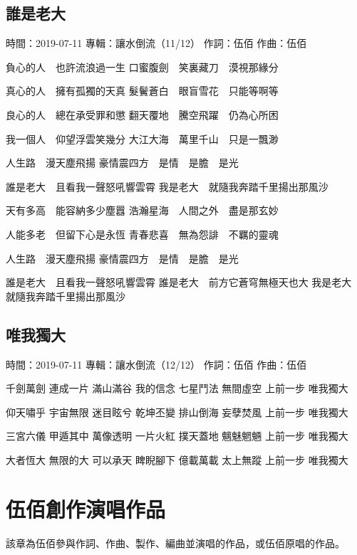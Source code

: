 \documentclass[UTF8,a4paper,oneside,twocolumn,12pt]{ctexbook}
\newcommand{\infopair}[2]{\textbullet #1：#2}
\newcommand{\zc}[1][伍佰]{\infopair{作詞}{#1}}
\newcommand{\zq}[1][伍佰]{\infopair{作曲}{#1}}
\newcommand{\zj}[1]{\infopair{專輯}{#1}}
\newcommand{\sj}[1]{\infopair{時間}{#1}}
\newenvironment{info}{\begin{flushleft}\kaishu
	}
	{\end{flushleft}\normalsize\yahei\par}
\newenvironment{lyric}{
	}
{}
\begin{document}
\section{誰是老大}
\begin{info}
	\sj{2019-07-11}
	\zj{讓水倒流（11/12）}
	\zc
	\zq
\end{info}
\begin{lyric}
	負心的人　也許流浪過一生
	口蜜腹劍　笑裏藏刀　漠視那緣分

	真心的人　擁有孤獨的天真
	髮鬢蒼白　眼盲雪花　只能等啊等

	良心的人　總在承受罪和懲
	翻天覆地　騰空飛躍　仍為心所困

	我一個人　仰望浮雲笑幾分
	大江大海　萬里千山　只是一飄渺

	人生路　漫天塵飛揚
	豪情震四方　是情　是膽　是光

	誰是老大　且看我一聲怒吼響雲霄
	我是老大　就隨我奔踏千里揚出那風沙

	天有多高　能容納多少塵囂
	浩瀚星海　人間之外　盡是那玄妙

	人能多老　但留下心是永恆
	青春悲喜　無為怨誹　不羈的靈魂

	人生路　漫天塵飛揚
	豪情震四方　是情　是膽　是光

	誰是老大　且看我一聲怒吼響雲霄
	誰是老大　前方它蒼穹無極天也大
	我是老大　就隨我奔踏千里揚出那風沙
\end{lyric}

\section{唯我獨大}
\begin{info}
	\sj{2019-07-11}
	\zj{讓水倒流（12/12）}
	\zc
	\zq
\end{info}
\begin{lyric}
	千劍萬劍 連成一片
	滿山滿谷 我的信念
	七星鬥法 無間虛空
	上前一步 唯我獨大

	仰天嘯乎 宇宙無限
	迷目眩兮 乾坤丕變
	排山倒海 妄孽焚風
	上前一步 唯我獨大

	三宮六儀 甲遁其中
	萬像透明 一片火紅
	撲天蓋地 魑魅魍魎
	上前一步 唯我獨大

	大者恆大 無限的大
	可以承天 睥睨腳下
	億載萬載 太上無蹤
	上前一步 唯我獨大
\end{lyric}

\chapter{伍佰創作演唱作品}
該章為伍佰參與作詞、作曲、製作、編曲並演唱的作品，或伍佰原唱的作品。
\end{document}
